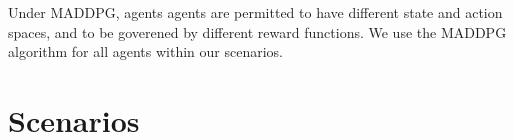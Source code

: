 \documentclass[11pt,a4paper]{article}
\begin{document}
Under MADDPG, agents agents are permitted to have different state and action spaces, and to be goverened by different reward functions.
We use the MADDPG algorithm for all agents within our scenarios.

% 
% 
% 

\section{Scenarios}
\label{sec:scenarios}
\end{document}
